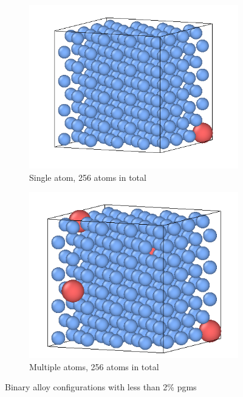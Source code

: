 \begin{figure}[htb]
\begin{subfigure}{.42\textwidth}
  \centering
  \includegraphics[width=.94\linewidth]{chapters/potentials_fe_pd_ru/slabs/bulk01.png}  
  \caption{Single atom, 256 atoms in total}
  \label{fig:sub-first}
\end{subfigure}
\begin{subfigure}{.42\textwidth}
  \centering
  \includegraphics[width=.94\linewidth]{chapters/potentials_fe_pd_ru/slabs/bulk02.png}  
  \caption{Multiple atoms, 256 atoms in total}
  \label{fig:sub-first}
\end{subfigure}
\caption{Binary alloy configurations with less than 2\% \acrshort{pgm}s}
\label{fig:binaryalloyconfigurationsbulk}
\end{figure}

